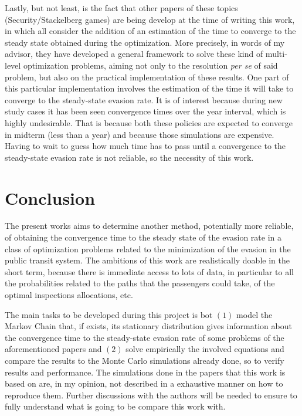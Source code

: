 \documentclass[10pt,letterpaper]{article}
\begin{document}
Lastly, but not least, is the fact that other papers of these topics (Security/Stackelberg games) are being develop at the time of writing this work, in which all consider the addition of an estimation of the time to converge to the steady state obtained during the optimization. More precisely, in words of my advisor, they have developed a general framework to solve these kind of multi-level optimization problems, aiming not only to the resolution \textit{per se} of said problem, but also on the practical implementation of these results. One part of this particular implementation involves the estimation of the time it will take to converge to the steady-state evasion rate. It is of interest because during new study cases it has been seen convergence times over the year interval, which is highly undesirable. That is because both these policies are expected to converge in midterm (less than a year) and because those simulations are expensive. Having to wait to guess how much time has to pass until a convergence to the steady-state evasion rate is not reliable, so the necessity of this work.

\section*{Conclusion}
The present works aims to determine another method, potentially more reliable, of obtaining the convergence time to the steady state of the evasion rate in a class of optimization problems related to the minimization of the evasion in the public transit system. The ambitions of this work are realistically doable in the short term, because there is immediate access to lots of data, in particular to all the probabilities related to the paths that the passengers could take, of the optimal inspections allocations, etc.\par
The main tasks to be developed during this project is bot $(1)$ model the Markov Chain that, if exists, its stationary distribution gives information about the convergence time to the steady-state evasion rate of some problems of the aforementioned papers and $(2)$ solve empirically the involved equations and compare the results to the Monte Carlo simulations already done, so to verify results and performance. The simulations done in the papers that this work is based on are, in my opinion, not described in a exhaustive manner on how to reproduce them. Further discussions with the authors will be needed to ensure to fully understand what is going to be compare this work with.




\clearpage
{}

\end{document}
